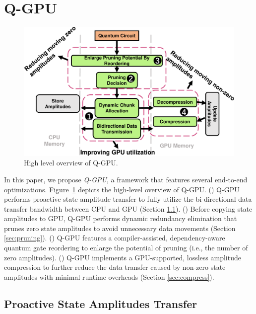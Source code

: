 \section{Q-GPU}
\label{sec:qgpu}

\begin{figure}[t!]
    \includegraphics[width=\textwidth]{Images/appendix2/section-4/overview.pdf}
    \centering
    \caption{High level overview of Q-GPU.}
    \label{fig-5}
    \vspace{-5pt}
\end{figure}

In this paper, we propose {\it Q-GPU}, a framework that features several end-to-end optimizations. Figure~\ref{fig-5} depicts the high-level overview of Q-GPU. () Q-GPU performs proactive state amplitude transfer to fully utilize the bi-directional data transfer bandwidth between CPU and GPU (Section \ref{sec:overlap}). () Before copying state amplitudes to GPU, Q-GPU performs dynamic redundancy elimination that prunes zero state amplitudes to avoid unnecessary data movements (Section \ref{sec:pruning}). () Q-GPU features a compiler-assisted, dependency-aware quantum gate reordering to enlarge the potential of pruning (i.e., the number of zero amplitudes). () Q-GPU implements a GPU-supported, lossless amplitude compression to further reduce the data transfer caused by non-zero state amplitudes with minimal runtime overheads (Section \ref{sec:compress}).

\subsection{Proactive State Amplitudes Transfer}
\label{sec:overlap}

